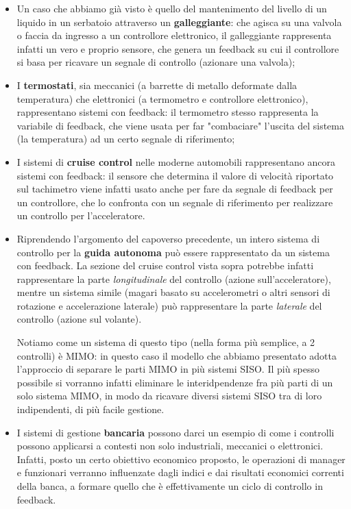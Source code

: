 \documentclass[a4paper,11pt]{article}
\begin{document}
\begin{itemize}
	\item Un caso che abbiamo già visto è quello del mantenimento del livello di un liquido in un serbatoio attraverso un \textbf{galleggiante}: che agisca su una valvola o faccia da ingresso a un controllore elettronico, il galleggiante rappresenta infatti un vero e proprio sensore, che genera un feedback su cui il controllore si basa per ricavare un segnale di controllo (azionare una valvola);
	\item I \textbf{termostati}, sia meccanici (a barrette di metallo deformate dalla temperatura) che elettronici (a termometro e controllore elettronico), rappresentano sistemi con feedback: il termometro stesso rappresenta la variabile di feedback, che viene usata per far "combaciare" l'uscita del sistema (la temperatura) ad un certo segnale di riferimento;
	\item I sistemi di \textbf{cruise control} nelle moderne automobili rappresentano ancora sistemi con feedback: il sensore che determina il valore di velocità riportato sul tachimetro viene infatti usato anche per fare da segnale di feedback per un controllore, che lo confronta con un segnale di riferimento per realizzare un controllo per l'acceleratore. 
	\item Riprendendo l'argomento del capoverso precedente, un intero sistema di controllo per la \textbf{guida autonoma} può essere rappresentato da un sistema con feedback.
		La sezione del cruise control vista sopra potrebbe infatti rappresentare la parte \textit{longitudinale} del controllo (azione sull'acceleratore), mentre un sistema simile (magari basato su accelerometri o altri sensori di rotazione e accelerazione laterale) può rappresentare la parte \textit{laterale} del controllo (azione sul volante).
		
		Notiamo come un sistema di questo tipo (nella forma più semplice, a 2 controlli) è MIMO: in questo caso il modello che abbiamo presentato adotta l'approccio di separare le parti MIMO in più sistemi SISO.
		Il più spesso possibile si vorranno infatti eliminare le interidpendenze fra più parti di un solo sistema MIMO, in modo da ricavare diversi sistemi SISO tra di loro indipendenti, di più facile gestione.

	\item I sistemi di gestione \textbf{bancaria} possono darci un esempio di come i controlli possono applicarsi a contesti non solo industriali, meccanici o elettronici.	Infatti, posto un certo obiettivo economico proposto, le operazioni di manager e funzionari verranno influenzate dagli indici e dai risultati economici correnti della banca, a formare quello che è effettivamente un ciclo di controllo in feedback.
	

\end{itemize}
\end{document}
